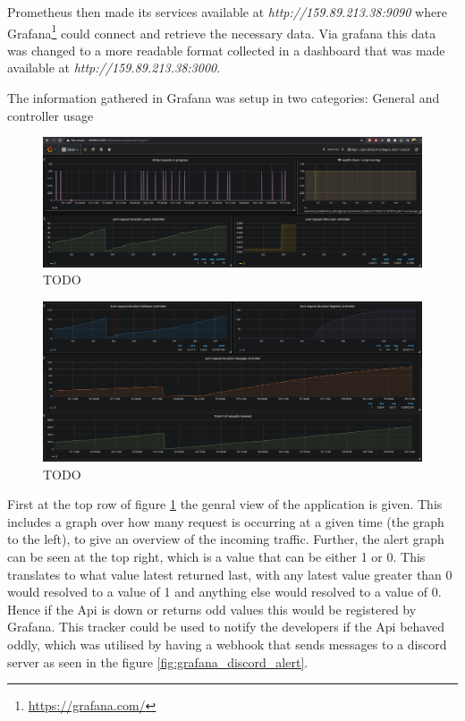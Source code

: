\documentclass[report/main.tex]{subfiles}
\begin{document}
            Prometheus then made its services available at \textit{http://159.89.213.38:9090} where Grafana\footnote{\hyperlink{https://grafana.com/}{https://grafana.com/}} could connect and retrieve the necessary data. Via grafana this data was changed to a more readable format collected in a dashboard that was made available at \textit{http://159.89.213.38:3000}.
            
            The information gathered in Grafana was setup in two categories: General and controller usage
                
            \begin{figure}[H]
                \centering
                \includegraphics[width=\textwidth]{report/images/Grafana EvilTwitter 1.jpg}
                \caption{TODO}
                \label{fig:grafana_setup_1}
            \end{figure}
                
            \begin{figure}[H]
                \centering
                \includegraphics[width=\textwidth]{report/images/Grafana EvilTwitter 2.jpg}
                \caption{TODO}
                \label{fig:grafana_setup_2}
            \end{figure}
            
            First at the top row of figure \ref{fig:grafana_setup_1} the genral view of the application is given. This includes a graph over how many request is occurring at a given time (the graph to the left), to give an overview of the incoming traffic. Further, the alert graph can be seen at the top right, which is a value that can be either 1 or 0. This translates to what value latest returned last, with any latest value greater than 0 would resolved to a value of 1 and anything else would resolved to a value of 0. Hence if the Api is down or returns odd values this would be registered by Grafana. This tracker could be used to notify the developers if the Api behaved oddly, which was utilised by having a webhook that sends messages to a discord server as seen in the figure \ref{fig:grafana_discord_alert}.
                
\end{document}
